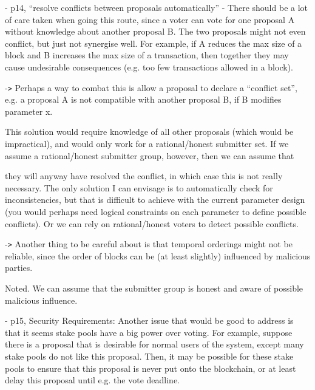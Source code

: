 \vspace{12pt}
\baselineskip=12pt
\leftskip=0pt
- p14, ``resolve conflicts between proposals automatically'' - There should be 
a lot of care taken when going this route, since a voter can vote for one proposal 
A without knowledge about another proposal B. The two proposals might not even 
conflict, but just not synergise well. For example, if A reduces the max size of 
a block and B increases the max size of a transaction, then together they may cause 
undesirable consequences (e.g. too few transactions allowed in a block).

\parindent=18pt
-\texttt{>} Perhaps a way to combat this is allow a proposal to declare a ``conflict 
set'', e.g. a proposal A is not compatible with another proposal B, if B modifies 
parameter x. 

\vspace{12pt}
\parindent=0pt
{\color{color02} This solution would require knowledge of all other proposals (which 
would be impractical), and would only work for a rational/honest submitter set. 
 If we assume a rational/honest submitter group, however, then we can assume that}

{\color{color02} they will anyway have resolved the conflict, in which case this 
is not really necessary.  The only solution I can envisage is to automatically 
check for inconsistencies, but that is difficult to achieve with the current parameter 
design (you would perhaps need logical constraints on each parameter to define 
possible conflicts).  Or we can rely on rational/honest voters to detect possible 
conflicts.}

\vspace{12pt}
\parindent=18pt
-\texttt{>} Another thing to be careful about is that temporal orderings might 
not be reliable, since the order of blocks can be (at least slightly) influenced 
by malicious parties.

\vspace{12pt}
\parindent=0pt
{\color{color02} Noted.  We can assume that the submitter group is honest and aware 
of possible malicious influence.}

\vspace{12pt}
- p15, Security Requirements: Another issue that would be good to address is that 
it seems stake pools have a big power over voting. For example, suppose there is 
a proposal that is desirable for normal users of the system, except many stake 
pools do not like this proposal. Then, it may be possible for these stake pools 
to ensure that this proposal is never put onto the blockchain, or at least delay 
this proposal until e.g. the vote deadline. 


